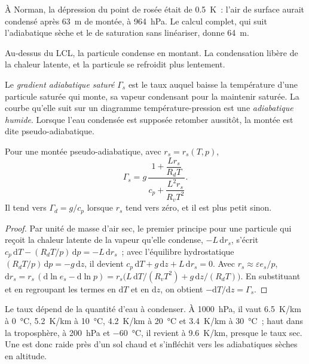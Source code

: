 À Norman, la dépression du point de rosée était de \qty{0.5}{K}~: l'air de surface aurait
condensé après \qty{63}{m} de montée, à \qty{964}{hPa}. Le calcul complet, qui suit
l'adiabatique sèche et le  de saturation sans linéariser, donne \qty{64}{m}.

Au-dessus du LCL, la particule condense en montant. La condensation libère
de la chaleur latente, et la particule se refroidit plus lentement.

\begin{definition}\label{def:b2:atmospheric-thermodynamics:moist-adiabat}
Le \emph{gradient adiabatique saturé} $\Gamma_s$
est le taux auquel baisse la température d'une particule saturée qui monte, sa vapeur
condensant pour la maintenir saturée. La courbe qu'elle suit sur un diagramme
température-pression est une \emph{adiabatique humide}. Lorsque
l'eau condensée est supposée retomber aussitôt, la montée est dite pseudo-adiabatique.
\end{definition}

\begin{proposition}\label{prop:b2:atmospheric-thermodynamics:gamma-s}
Pour une montée pseudo-adiabatique, avec $r_s = r_s(T, p)$,
\[
  \Gamma_s = g\,\frac{1 + \dfrac{L r_s}{R_d T}}{c_p + \dfrac{L^2 r_s}{R_v T^2}} .
\]
Il tend vers $\Gamma_d = g/c_p$ lorsque $r_s$ tend vers zéro, et il est plus petit sinon.
\end{proposition}

\begin{proof}
Par unité de masse d'air sec, le premier principe pour une particule qui reçoit la chaleur latente de la
vapeur qu'elle condense, $-L\,\mathrm{d}r_s$, s'écrit $c_p\,\mathrm{d}T - (R_dT/p)\,\mathrm{d}p = -L\,
\mathrm{d}r_s$~; avec l'équilibre hydrostatique $(R_dT/p)\,\mathrm{d}p = -g\,\mathrm{d}z$, il devient
$c_p\,\mathrm{d}T + g\,\mathrm{d}z + L\,\mathrm{d}r_s = 0$. Avec $r_s \approx \varepsilon e_s/p$,
$\mathrm{d}r_s = r_s\,(\mathrm{d}\ln e_s - \mathrm{d}\ln p) = r_s\bigl(L\,\mathrm{d}T/(R_vT^2) +
g\,\mathrm{d}z/(R_dT)\bigr)$. En substituant et en regroupant les termes en
$\mathrm{d}T$ et en $\mathrm{d}z$, on obtient $-\mathrm{d}T/\mathrm{d}z = \Gamma_s$.
\end{proof}

Le taux dépend de la quantité d'eau à condenser. À \qty{1000}{hPa}, il vaut \qty{6.5}{K/km} à
\qty{0}{\celsius}, \qty{5.2}{K/km} à \qty{10}{\celsius}, \qty{4.2}{K/km} à \qty{20}{\celsius}
et \qty{3.4}{K/km} à \qty{30}{\celsius}~; haut dans la troposphère, à \qty{200}{hPa} et
\qty{-60}{\celsius}, il revient à \qty{9.6}{K/km}, presque le taux sec. Une 
est donc raide près d'un sol chaud et s'infléchit vers les adiabatiques sèches en altitude.

